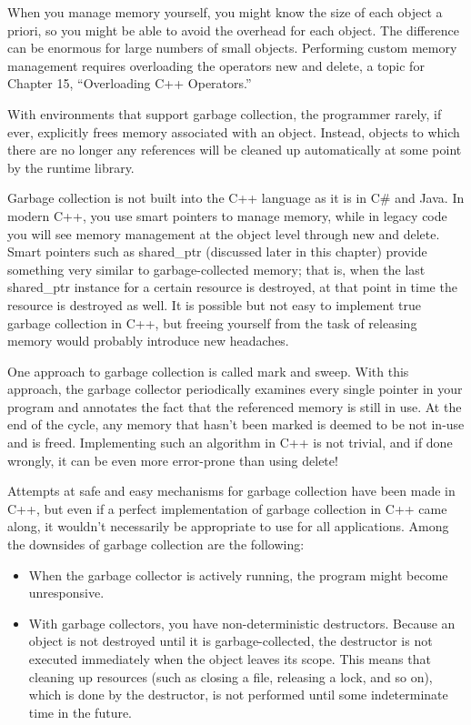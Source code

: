 When you manage memory yourself, you might know the size of each object a priori, so you might be able to avoid the overhead for each object. The difference can be enormous for large numbers of small objects. Performing custom memory management requires overloading the operators new and delete, a topic for Chapter 15, “Overloading C++ Operators.”


With environments that support garbage collection, the programmer rarely, if ever, explicitly frees memory associated with an object. Instead, objects to which there are no longer any references will be cleaned up automatically at some point by the runtime library.

Garbage collection is not built into the C++ language as it is in C\# and Java. In modern C++, you use smart pointers to manage memory, while in legacy code you will see memory management at the object level through new and delete. Smart pointers such as shared\_ptr (discussed later in this chapter) provide something very similar to garbage-collected memory; that is, when the last shared\_ptr instance for a certain resource is destroyed, at that point in time the resource is destroyed as well. It is possible but not easy to implement true garbage collection in C++, but freeing yourself from the task of releasing memory would probably introduce new headaches.

One approach to garbage collection is called mark and sweep. With this approach, the garbage collector periodically examines every single pointer in your program and annotates the fact that the referenced memory is still in use. At the end of the cycle, any memory that hasn’t been marked is deemed to be not in-use and is freed. Implementing such an algorithm in C++ is not trivial, and if done wrongly, it can be even more error-prone than using delete!

Attempts at safe and easy mechanisms for garbage collection have been made in C++, but even if a perfect implementation of garbage collection in C++ came along, it wouldn’t necessarily be appropriate to use for all applications. Among the downsides of garbage collection are the following:

\begin{itemize}
\item
When the garbage collector is actively running, the program might become unresponsive.

\item
With garbage collectors, you have non-deterministic destructors. Because an object is not destroyed until it is garbage-collected, the destructor is not executed immediately when the object leaves its scope. This means that cleaning up resources (such as closing a file, releasing a lock, and so on), which is done by the destructor, is not performed until some indeterminate time in the future.
\end{itemize}

